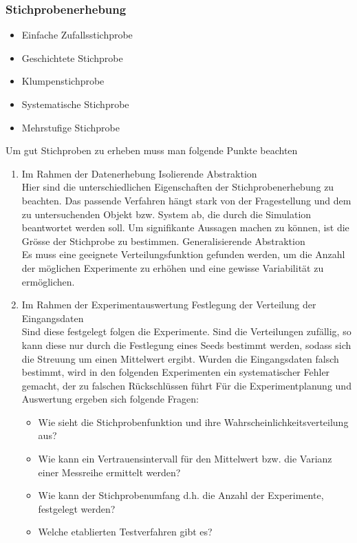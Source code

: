 \subsubsection{Stichprobenerhebung}
\begin{itemize}
	\item Einfache Zufallsstichprobe
	\item Geschichtete Stichprobe
	\item Klumpenstichprobe
	\item Systematische Stichprobe
	\item Mehrstufige Stichprobe
\end{itemize}
Um gut Stichproben zu erheben muss man folgende Punkte beachten
\begin{enumerate}
\item Im Rahmen der Datenerhebung
\subitem Isolierende Abstraktion\\
Hier sind die unterschiedlichen Eigenschaften der Stichprobenerhebung zu beachten. Das passende Verfahren hängt stark von der Fragestellung und dem zu untersuchenden Objekt bzw. System ab, die durch die Simulation beantwortet werden soll. Um signifikante Aussagen machen zu können, ist die Grösse der Stichprobe zu bestimmen.
\subitem Generalisierende Abstraktion\\
Es muss eine geeignete Verteilungsfunktion gefunden werden, um die Anzahl der möglichen Experimente zu erhöhen und eine gewisse Variabilität zu ermöglichen.
\item Im Rahmen der Experimentauswertung
\subitem Festlegung der Verteilung der Eingangsdaten\\
Sind diese festgelegt folgen die Experimente. Sind die Verteilungen zufällig, so kann diese nur durch die Festlegung eines Seeds bestimmt werden, sodass sich die Streuung um einen Mittelwert ergibt. Wurden die Eingangsdaten falsch bestimmt, wird in den folgenden Experimenten ein systematischer Fehler gemacht, der zu falschen Rückschlüssen führt
\subitem Für die Experimentplanung und Auswertung ergeben sich folgende Fragen:
\pagebreak[2]
\begin{itemize}
\item Wie sieht die Stichprobenfunktion und ihre Wahrscheinlichkeitsverteilung aus?
\item Wie kann ein Vertrauensintervall für den Mittelwert bzw. die Varianz einer Messreihe ermittelt werden?
\item Wie kann der Stichprobenumfang d.h. die Anzahl der Experimente, festgelegt werden?
\item Welche etablierten Testverfahren gibt es?
\end{itemize}
\end{enumerate}
